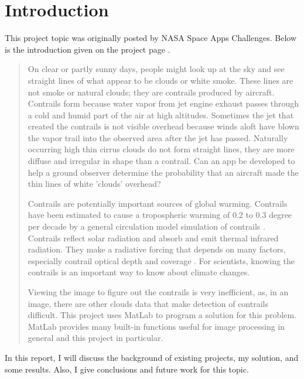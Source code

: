\chapter{Introduction}

This project topic was originally posted by NASA Space Apps Challenges. 
Below is the introduction given on the project page \cite{SpaceApps}.
\begin{quote}
On clear or partly sunny days, people might look up at the sky and see straight 
lines of what appear to be clouds or white smoke. These lines are not smoke 
or natural clouds; they are contrails produced by aircraft. Contrails form 
because water vapor from jet engine exhaust passes through a cold and humid 
part of the air at high altitudes. Sometimes the jet that created the contrails 
is not visible overhead because winds aloft have blown the vapor trail into 
the observed area after the jet has passed. Naturally occurring high thin 
cirrus clouds do not form straight lines, they are more diffuse and irregular 
in shape than a contrail. Can an app be developed to help a ground observer 
determine the probability that an aircraft made the thin lines 
of white 'clouds' overhead?

Contrails are potentially important sources of global warming. Contrails have 
been estimated to cause a tropospheric warming of 0.2 to 0.3 degree per decade 
by a general circulation model simulation of contrails \cite{Minnis-et-al-2004}. 
Contrails reflect solar radiation and absorb and emit thermal infrared radiation. 
They make a radiative forcing that depends on many factors, especially contrail 
optical depth and coverage \cite{Sassen-1997}. For scientists, knowing the contrails 
is an important way to know about climate changes. 

Viewing the image to figure out the contrails is very inefficient, as, in an image, 
there are other clouds data that make detection of contrails difficult. This 
project uses MatLab to program a solution for this problem. MatLab provides 
many built-in functions useful for image processing in general and this project 
in particular. 
\end{quote}

In this report, I will discuss the background of existing projects, my solution, 
and some results. Also, I give conclusions and future work for this topic.
